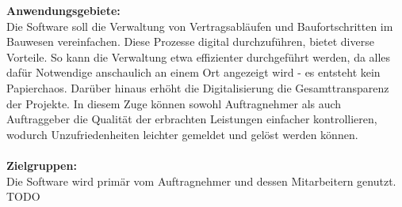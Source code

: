 %

\textbf{Anwendungsgebiete:}\\
Die Software soll die Verwaltung von Vertragsabläufen und Baufortschritten im Bauwesen vereinfachen.
Diese Prozesse digital durchzuführen, bietet diverse Vorteile.
So kann die Verwaltung etwa effizienter durchgeführt werden, da alles dafür Notwendige anschaulich an einem Ort angezeigt wird - es entsteht kein Papierchaos.
Darüber hinaus erhöht die Digitalisierung die Gesamttransparenz der Projekte.
In diesem Zuge können sowohl Auftragnehmer als auch Auftraggeber die Qualität der erbrachten Leistungen einfacher kontrollieren, wodurch Unzufriedenheiten leichter gemeldet und gelöst werden können.\\\\

\noindent \textbf{Zielgruppen:}\\
Die Software wird primär vom Auftragnehmer und dessen Mitarbeitern genutzt. TODO